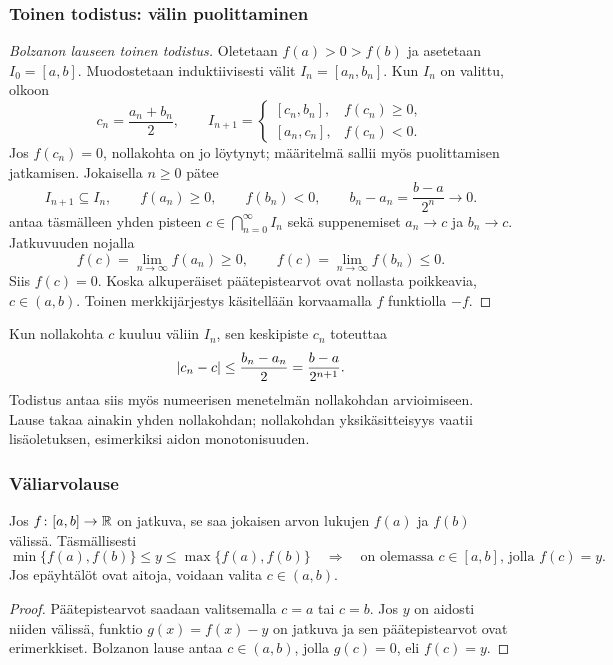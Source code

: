 \documentclass[11pt,a4paper]{amsart}
\begin{document}
\newpage
\subsubsection*{Toinen todistus: välin puolittaminen}

\begin{proof}[Bolzanon lauseen toinen todistus]
  Oletetaan $f(a)>0>f(b)$ ja asetetaan $I_0=[a,b]$.
  Muodostetaan induktiivisesti välit $I_n=[a_n,b_n]$.
  Kun $I_n$ on valittu, olkoon
  \[
    c_n=\frac{a_n+b_n}{2},\qquad
    I_{n+1}=
    \begin{cases}
      [c_n,b_n],&f(c_n)\ge0,\\
      [a_n,c_n],&f(c_n)<0.
    \end{cases}
  \]
  Jos $f(c_n)=0$, nollakohta on jo löytynyt; määritelmä sallii
  myös puolittamisen jatkamisen. Jokaisella $n\ge0$ pätee
  \[
    I_{n+1}\subseteq I_n,\qquad
    f(a_n)\ge0,\qquad f(b_n)<0,\qquad
    b_n-a_n=\frac{b-a}{2^n}\longrightarrow0.
  \]
   antaa täsmälleen yhden pisteen
  $c\in\bigcap_{n=0}^{\infty}I_n$ sekä suppenemiset
  $a_n\to c$ ja $b_n\to c$. Jatkuvuuden nojalla
  \[
    f(c)=\lim_{n\to\infty}f(a_n)\ge0,
    \qquad
    f(c)=\lim_{n\to\infty}f(b_n)\le0.
  \]
  Siis $f(c)=0$. Koska alkuperäiset päätepistearvot ovat
  nollasta poikkeavia, $c\in(a,b)$.
  Toinen merkkijärjestys käsitellään korvaamalla $f$ funktiolla $-f$.
\end{proof}

\begin{remark}
  Kun nollakohta $c$ kuuluu väliin $I_n$, sen keskipiste $c_n$
  toteuttaa
  \[
    \lvert c_n-c\rvert\le\frac{b_n-a_n}{2}
    =\frac{b-a}{2^{n+1}}.
  \]
  Todistus antaa siis myös numeerisen menetelmän nollakohdan
  arvioimiseen. Lause takaa ainakin yhden nollakohdan;
  nollakohdan yksikäsitteisyys vaatii lisäoletuksen,
  esimerkiksi aidon monotonisuuden.
\end{remark}

\subsubsection*{Väliarvolause}

\begin{corollary}[Väliarvolause]
  \label{cor:intermediate-value}
  Jos $f\colon[a,b]\to\mathbb{R}$ on jatkuva, se saa jokaisen arvon
  lukujen $f(a)$ ja $f(b)$ välissä. Täsmällisesti
  \[
    \min\{f(a),f(b)\}\le y\le\max\{f(a),f(b)\}
    \quad\Longrightarrow\quad
    \text{on olemassa }c\in[a,b]\text{, jolla }f(c)=y.
  \]
  Jos epäyhtälöt ovat aitoja, voidaan valita $c\in(a,b)$.
\end{corollary}
\begin{proof}
  Päätepistearvot saadaan valitsemalla $c=a$ tai $c=b$.
  Jos $y$ on aidosti niiden välissä, funktio
  $g(x)=f(x)-y$ on jatkuva ja sen päätepistearvot ovat
  erimerkkiset. Bolzanon lause antaa $c\in(a,b)$, jolla
  $g(c)=0$, eli $f(c)=y$.
\end{proof}
\end{document}
